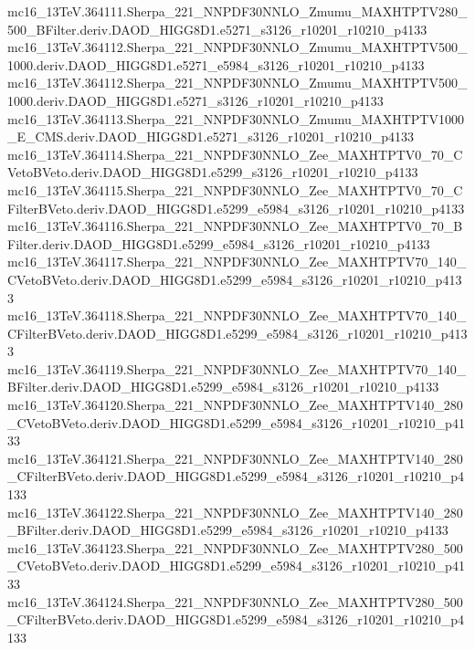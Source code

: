 \begin{footnotesize}
mc16\_13TeV.364111.Sherpa\_221\_NNPDF30NNLO\_Zmumu\_MAXHTPTV280\_500\_BFilter.deriv.DAOD\_HIGG8D1.e5271\_s3126\_r10201\_r10210\_p4133 \\
mc16\_13TeV.364112.Sherpa\_221\_NNPDF30NNLO\_Zmumu\_MAXHTPTV500\_1000.deriv.DAOD\_HIGG8D1.e5271\_e5984\_s3126\_r10201\_r10210\_p4133 \\
mc16\_13TeV.364112.Sherpa\_221\_NNPDF30NNLO\_Zmumu\_MAXHTPTV500\_1000.deriv.DAOD\_HIGG8D1.e5271\_s3126\_r10201\_r10210\_p4133 \\
mc16\_13TeV.364113.Sherpa\_221\_NNPDF30NNLO\_Zmumu\_MAXHTPTV1000\_E\_CMS.deriv.DAOD\_HIGG8D1.e5271\_s3126\_r10201\_r10210\_p4133 \\
mc16\_13TeV.364114.Sherpa\_221\_NNPDF30NNLO\_Zee\_MAXHTPTV0\_70\_CVetoBVeto.deriv.DAOD\_HIGG8D1.e5299\_s3126\_r10201\_r10210\_p4133 \\
mc16\_13TeV.364115.Sherpa\_221\_NNPDF30NNLO\_Zee\_MAXHTPTV0\_70\_CFilterBVeto.deriv.DAOD\_HIGG8D1.e5299\_e5984\_s3126\_r10201\_r10210\_p4133 \\
mc16\_13TeV.364116.Sherpa\_221\_NNPDF30NNLO\_Zee\_MAXHTPTV0\_70\_BFilter.deriv.DAOD\_HIGG8D1.e5299\_e5984\_s3126\_r10201\_r10210\_p4133 \\
mc16\_13TeV.364117.Sherpa\_221\_NNPDF30NNLO\_Zee\_MAXHTPTV70\_140\_CVetoBVeto.deriv.DAOD\_HIGG8D1.e5299\_e5984\_s3126\_r10201\_r10210\_p4133 \\
mc16\_13TeV.364118.Sherpa\_221\_NNPDF30NNLO\_Zee\_MAXHTPTV70\_140\_CFilterBVeto.deriv.DAOD\_HIGG8D1.e5299\_e5984\_s3126\_r10201\_r10210\_p4133 \\
mc16\_13TeV.364119.Sherpa\_221\_NNPDF30NNLO\_Zee\_MAXHTPTV70\_140\_BFilter.deriv.DAOD\_HIGG8D1.e5299\_e5984\_s3126\_r10201\_r10210\_p4133 \\
mc16\_13TeV.364120.Sherpa\_221\_NNPDF30NNLO\_Zee\_MAXHTPTV140\_280\_CVetoBVeto.deriv.DAOD\_HIGG8D1.e5299\_e5984\_s3126\_r10201\_r10210\_p4133 \\
mc16\_13TeV.364121.Sherpa\_221\_NNPDF30NNLO\_Zee\_MAXHTPTV140\_280\_CFilterBVeto.deriv.DAOD\_HIGG8D1.e5299\_e5984\_s3126\_r10201\_r10210\_p4133 \\
mc16\_13TeV.364122.Sherpa\_221\_NNPDF30NNLO\_Zee\_MAXHTPTV140\_280\_BFilter.deriv.DAOD\_HIGG8D1.e5299\_e5984\_s3126\_r10201\_r10210\_p4133 \\
mc16\_13TeV.364123.Sherpa\_221\_NNPDF30NNLO\_Zee\_MAXHTPTV280\_500\_CVetoBVeto.deriv.DAOD\_HIGG8D1.e5299\_e5984\_s3126\_r10201\_r10210\_p4133 \\
mc16\_13TeV.364124.Sherpa\_221\_NNPDF30NNLO\_Zee\_MAXHTPTV280\_500\_CFilterBVeto.deriv.DAOD\_HIGG8D1.e5299\_e5984\_s3126\_r10201\_r10210\_p4133 \\

\end{footnotesize}
